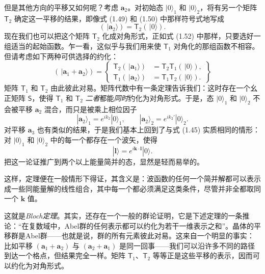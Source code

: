 但是其他方向的平移又如何呢？考虑 $\mathbf{a}_2$。对初始态 $|0\rangle_1$ 和 $|0\rangle_2$，将有另一个矩阵 $\mathsf{T}_2$ 确定这一平移的结果，即像式 (1.49) 和 (1.50) 中那样符号式地写成
\begin{equation*}
\left(\,|\mathbf{a}_2\rangle\right)=\mathsf{T}_2\left(\,|0\rangle\right).
\tag{1.54}
\end{equation*}
现在我们也可以把这个矩阵 $\mathsf{T}_2$ 化成对角形式，正如式 (1.52) 中那样，只要选好一组适当的起始函数。乍一看，这似乎与我们用来使 $\mathsf{T}_1$ 对角化的那组函数不相容。但请考虑如下两种可供选择的约化：
\begin{equation*}
\left(\,|\mathbf{a}_1+\mathbf{a}_2\rangle\right)=
\left\{\begin{aligned}
\mathsf{T}_2(\,|\mathbf{a}_1\rangle)&=\mathsf{T}_2\mathsf{T}_1(\,|0\rangle),\\
\mathsf{T}_1(\,|\mathbf{a}_2\rangle)&=\mathsf{T}_1\mathsf{T}_2(\,|0\rangle).
\end{aligned}\right\}
\tag{1.55}
\end{equation*}
矩阵 $\mathsf{T}_1$ 和 $\mathsf{T}_2$ 由此彼此对易。矩阵代数中有一条定理告诉我们：这时存在一个幺正矩阵 $\mathsf{S}$，使得 $\mathsf{T}_1$ 和 $\mathsf{T}_2$ \emph{二者}都能\emph{同时}约化为对角形式。于是，态 $|0\rangle_1$ 和 $|0\rangle_2$ 不会被平移 $\mathbf{a}_2$ 混合，而只是被乘上相位因子
\begin{equation*}
|\mathbf{a}_2\rangle_1=e^{ik_2}|0\rangle_1,\qquad|\mathbf{a}_2\rangle_2=e^{ik_2'}|0\rangle_2.
\tag{1.56}
\end{equation*}
对平移 $\mathbf{a}_3$ 也有类似的结果，于是我们基本上回到了与式 (1.45) 实质相同的情形：对 $|0\rangle_1$ 和 $|0\rangle_2$ 中的每一个都存在一个波矢，使得
\begin{equation*}
|\mathbf{l}\rangle=e^{i\mathbf{k}\cdot\mathbf{l}}|0\rangle.
\tag{1.57}
\end{equation*}
把这一论证推广到两个以上能量简并的态，显然是轻而易举的。

这样，定理便在一般情形下得证，其含义是：波函数的任何一个简并解都可以表示成一些同能量解的线性组合，其中每一个都必须满足这类条件，尽管并非全都取同一个 $\mathbf{k}$ 值。

这就是\emph{Bloch定理}。其实，还存在一个一般的群论证明，它是下述定理的一条推论：“在复数域中，Abel群的任何表示都可以约化为若干一维表示之和”。晶体的平移群是Abel群——也就是说，群的所有元素彼此对易。这来自一个明显的事实：比如平移 $(\mathbf{a}_1+\mathbf{a}_2)$ 与 $(\mathbf{a}_2+\mathbf{a}_1)$ 是同一回事——我们可以沿许多不同的路径到达一个格点，但结果完全一样。矩阵 $\mathsf{T}_1$、$\mathsf{T}_2$ 等等正是这些平移的表示，因而可以约化为对角形式。

